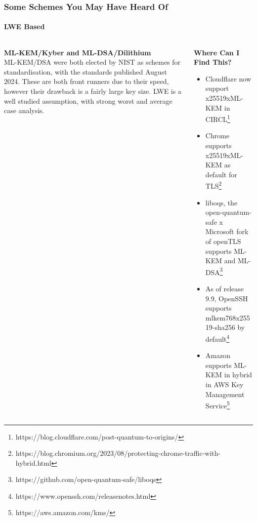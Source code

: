 \documentclass[
aspectratio=169, %
t, %
onlytextwidth, %
10pt, %
]{beamer}
\begin{document}
\begin{frame}
    \frametitle{Some Schemes You May Have Heard Of}
    \framesubtitle{LWE Based}

    \begin{columns}[T] %
        \begin{column}{0.42\linewidth} %
            \textbf{ML-KEM/Kyber and ML-DSA/Dilithium}\\
            
            ML-KEM/DSA were both elected by NIST as schemes for standardisation, with the standards published August 2024. These are both front runners due to their speed, however their drawback is a fairly large key size. LWE is a well studied assumption, with strong worst and average case analysis.
        \end{column}
        \begin{column}{0.55\linewidth} %
            \textbf{Where Can I Find This?}\\
            \begin{itemize}
                \item Cloudflare now support x25519xML-KEM in CIRCL\footnote{https://blog.cloudflare.com/post-quantum-to-origins/}
            \item Chrome supports x25519xML-KEM as default for TLS\footnote{https://blog.chromium.org/2023/08/protecting-chrome-traffic-with-hybrid.html}
                \item liboqs, the open-quantum-safe x Microsoft fork of openTLS supports ML-KEM and ML-DSA\footnote{https://github.com/open-quantum-safe/liboqs}
                \item As of release 9.9, OpenSSH supports mlkem768x25519-sha256 by default\footnote{https://www.openssh.com/releasenotes.html}
                \item Amazon supports ML-KEM in hybrid in AWS Key Management Service\footnote{https://aws.amazon.com/kms/}
            \end{itemize}
        \end{column}
    \end{columns}
\end{frame}

\end{document}
